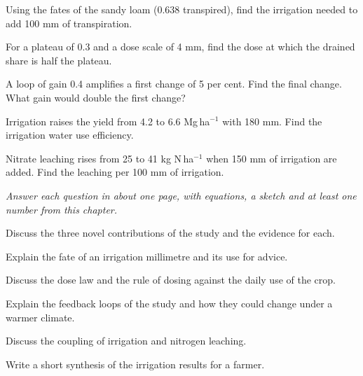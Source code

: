 \begin{exlist}
\item Using the fates of the sandy loam (0.638 transpired), find the irrigation needed to add 100 mm of transpiration.\exans{157 mm}
\item For a plateau of 0.3 and a dose scale of 4 mm, find the dose at which the drained share is half the plateau.\exans{2.8 mm}
\item A loop of gain 0.4 amplifies a first change of 5 per cent. Find the final change. What gain would double the first change?
\item Irrigation raises the yield from 4.2 to 6.6 Mg\,ha$^{-1}$ with 180 mm. Find the irrigation water use efficiency.
\item Nitrate leaching rises from 25 to 41 kg N\,ha$^{-1}$ when 150 mm of irrigation are added. Find the leaching per 100 mm of irrigation.
\end{exlist}
{\small\itshape Answer each question in about one page, with equations, a sketch and at least one number from this chapter.}\par\vspace{3pt}
\begin{exlist}
\item Discuss the three novel contributions of the study and the evidence for each.
\item Explain the fate of an irrigation millimetre and its use for advice.
\item Discuss the dose law and the rule of dosing against the daily use of the crop.
\item Explain the feedback loops of the study and how they could change under a warmer climate.
\item Discuss the coupling of irrigation and nitrogen leaching.
\item Write a short synthesis of the irrigation results for a farmer.
\end{exlist}

